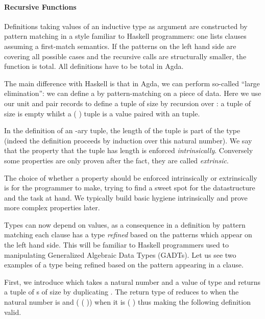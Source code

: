 \paragraph{Recursive Functions}

Definitions taking values of an inductive type as argument are constructed by
pattern matching in a style familiar to Haskell programmers: one lists
clauses assuming a first-match semantics. If the patterns on the left hand
side are covering all possible cases and the recursive calls are structurally
smaller, the function is total. All definitions have to be total in Agda.

The main difference with Haskell is that in Agda, we can perform so-called
``large elimination'': we can define a  by pattern-matching on a
piece of data. Here we use our unit and pair records to define a tuple of
size  by recursion over : a tuple of size  is empty
whilst a ( ) tuple is a value paired with an  tuple.


\begin{technique}
In the definition of an -ary tuple, the length of the tuple is part
of the type (indeed the definition proceeds by induction over this natural
number). We say that the property that the tuple has length  is
enforced \emph{intrinsically}. Conversely some properties are only proven
after the fact, they are called \emph{extrinsic}.

The choice of whether a property should be enforced intrinsically or
extrinsically is for the programmer to make, trying to find a sweet
spot for the datastructure and the task at hand. We typically build
basic hygiene intrinsically and prove more complex properties later.
\end{technique}


Types can now depend on values, as a consequence in a definition by pattern
matching each clause has a type \emph{refined} based on the patterns which appear
on the left hand side. This will be familiar to Haskell programmers used to
manipulating Generalized Algebraic Data Types (GADTs). Let us see two examples of
a type being refined based on the pattern appearing in a clause.

First, we introduce  which takes a natural number  and a value
 of type  and returns a tuple of s of size  by duplicating
. The return type of  reduces to  when the natural number
is  and (  (  )) when it is
( ) thus making the following definition valid.

